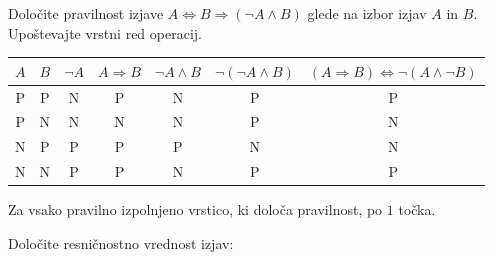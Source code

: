 \documentclass[addpoints]{exam}
\begin{document}
\begin{questions}

    
    \question[4]
    Določite pravilnost izjave $ A\Leftrightarrow B\Rightarrow (\lnot A\land B)$ glede na izbor izjav $A$ in $B$. Upoštevajte vrstni red operacij.

    \begin{solution}[12cm]
        \begin{table}[H]
            \begin{tabular}{ccccccc}
             $A$ & $B$ & $\lnot A$ & $A\Rightarrow B$ & $\lnot A\land B$ & $\lnot(\lnot A\land B)$ & $(A\Rightarrow  B)\Leftrightarrow \lnot(A\land \lnot B)$\\ \hline
             P & P & N & P & N & P & P \\ 
             P & N & N & N & N & P & N \\
             N & P & P & P & P & N & N \\
             N & N & P & P & N & P & P
            \end{tabular}
        \end{table}
        Za vsako pravilno izpolnjeno vrstico, ki določa pravilnost, po $1$ točka.

    \end{solution}




    \question[2]
    Določite resničnostno vrednost izjav:


\end{questions}
\end{document}
